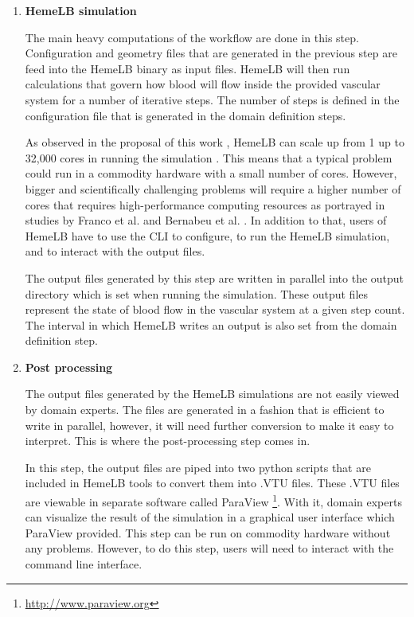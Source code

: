 \begin{enumerate}
\item{\textbf{HemeLB simulation}}

The main heavy computations of the workflow are done in this step.  Configuration and geometry files that are generated in the previous step are feed into the HemeLB binary as input files. HemeLB will then run calculations that govern how blood will flow inside the provided vascular system for a number of iterative steps. The number of steps is defined in the configuration file that is generated in the domain definition steps. 

As observed in the proposal of this work \citep{Steven:2016aa}, HemeLB can scale up from 1 up to 32,000 cores in running the simulation \citep{groen2013analysing}. This means that a typical problem could run in a commodity hardware with a small number of cores. However, bigger and scientifically challenging problems will require a higher number of cores that requires high-performance computing resources as portrayed in studies by Franco et al. \cite{franco2016non, franco2015dynamic} and Bernabeu et al. \cite{bernabeu2015characterization}. In addition to that, users of HemeLB have to use the CLI to configure, to run the HemeLB simulation, and to interact with the output files. 

The output files generated by this step are written in parallel into the output directory which is set when running the simulation. These output files represent the state of blood flow in the vascular system at a given step count. The interval in which HemeLB writes an output is also set from the domain definition step.

\item{\textbf{Post processing}}

The output files generated by the HemeLB simulations are not easily viewed by domain experts. The files are generated in a fashion that is efficient to write in parallel, however, it will need further conversion to make it easy to interpret. This is where the post-processing step comes in.  

In this step, the output files are piped into two python scripts that are included in HemeLB tools to convert them into .VTU files. These .VTU files are viewable in separate software called ParaView \footnote{\url{http://www.paraview.org}}. With it, domain experts can visualize the result of the simulation in a graphical user interface which ParaView provided. This step can be run on commodity hardware without any problems. However, to do this step, users will need to interact with the command line interface.

\end{enumerate}

